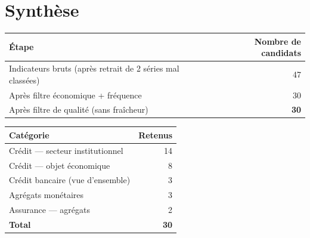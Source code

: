\documentclass[11pt,a4paper]{article}
\begin{document}
\section{Synthèse}

\begin{fichebox}
\begin{center}
\begin{tabular}{lr}
\toprule
\textbf{Étape} & \textbf{Nombre de candidats} \\
\midrule
Indicateurs bruts (après retrait de 2 séries mal classées) & 47 \\
Après filtre économique + fréquence & 30 \\
Après filtre de qualité (sans fraîcheur) & \textbf{30} \\
\bottomrule
\end{tabular}
\end{center}
\end{fichebox}

\begin{center}
\small
\begin{tabular}{lr}
\toprule
\textbf{Catégorie} & \textbf{Retenus} \\
\midrule
Crédit --- secteur institutionnel & 14 \\
Crédit --- objet économique & 8 \\
Crédit bancaire (vue d'ensemble) & 3 \\
Agrégats monétaires & 3 \\
Assurance --- agrégats & 2 \\
\midrule
\textbf{Total} & \textbf{30} \\
\bottomrule
\end{tabular}
\end{center}
\end{document}
